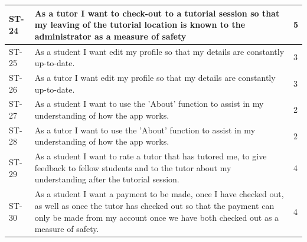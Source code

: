 \documentclass[12pt]{article}
\begin{document}
{{\begin{longtable}{| l | p{10cm}| l |}
			\\ \hline ST-24 & As a tutor I want to check-out to a tutorial session so that my leaving of the tutorial location is known to the administrator as a measure of safety  &5


			\\ \hline ST-25 & As a student I want edit my profile so that my details are constantly up-to-date.  	 &3


			\\ \hline ST-26 & As a tutor I want edit my profile so that my details are constantly up-to-date.  &3

			\\ \hline ST-27 & As a student I want to use the 'About' function to assist in my understanding of how the app works.  &2

			\\ \hline ST-28 & As a tutor I want to use the 'About' function to assist in my understanding of how the app works.   &2

			\\ \hline ST-29 & As a student I want to rate a tutor that has tutored me, to give feedback to fellow students and to the tutor about my understanding after the tutorial session. &4

			\\ \hline ST-30 & As a student I want a payment to be made, once I have checked out, as well as once the tutor has checked out so that the payment can only be made from my account once we have both checked out as a measure of safety.  &4 \\ \hline
\end{longtable}
}


}
\end{document}
